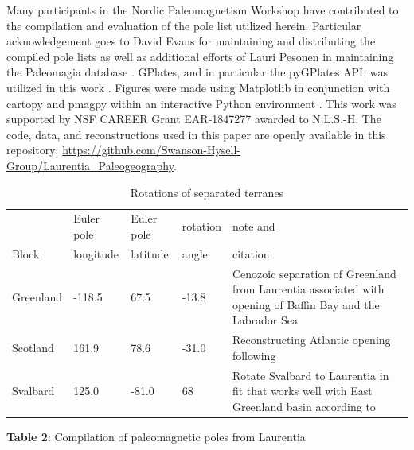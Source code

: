 \documentclass[11pt,letterpaper]{article}
\begin{document}
Many participants in the Nordic Paleomagnetism Workshop have contributed to the compilation and evaluation of the pole list utilized herein. Particular acknowledgement goes to David Evans for maintaining and distributing the compiled pole lists as well as additional efforts of Lauri Pesonen in maintaining the Paleomagia database \citep{Veikkolainen2014a}. GPlates, and in particular the pyGPlates API, was utilized in this work \citep{Muller2018b}. Figures were made using Matplotlib \citep{Hunter2007a} in conjunction with cartopy \citep{Met-Office2010a} and pmagpy \citep{Tauxe2016a} within an interactive Python environment \citep{Perez2007a}. This work was supported by NSF CAREER Grant EAR-1847277 awarded to N.L.S.-H. The code, data, and reconstructions used in this paper are openly available in this repository: \url{https://github.com/Swanson-Hysell-Group/Laurentia_Paleogeography}. 


\footnotesize


\begin{table}[hbt]
\caption{Rotations of separated terranes}
{\scriptsize
\begin{tabular}{|l|l|l|l|p{2 in}|}
  \hline
& Euler pole & Euler pole & rotation & note and \\
Block & longitude & latitude & angle & citation \\
\hline
Greenland & -118.5 & 67.5 & -13.8 & Cenozoic separation of Greenland from Laurentia associated with opening of Baffin Bay and the Labrador Sea \citep{Roest1989a} \\
\hline
Scotland & 161.9 & 78.6 & -31.0 & Reconstructing Atlantic opening following \cite{Torsvik2017a} \\
\hline
Svalbard & 125.0 & -81.0 & 68 & Rotate Svalbard to Laurentia in fit that works well with East Greenland basin according to \cite{Maloof2006a}\\
\hline
\end{tabular}
}
\label{tab:terrane_rotations}
\end{table}

\newpage

{\scriptsize
\begin{landscape}
\textbf{Table 2}: Compilation of paleomagnetic poles from Laurentia

\end{landscape}
}
\end{document}

